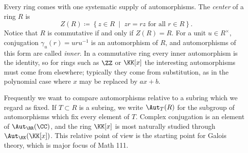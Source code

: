 \documentclass[12pt,reqno]{amsart}
\begin{document}
Every ring comes with one systematic supply of automorphisms. The \emph{center} of a ring $R$ is
\[
 Z(R)\coloneqq\left\{z\in R \;\; \big| \;\; zr=rz \text{ for all } r\in R\right\}.
\]
Notice that $R$ is commutative if and only if $Z(R)=R$. For a unit $u\in R^\times$, conjugation $\gamma_u(r)=uru^{-1}$ is an automorphism of $R$, and automorphisms of this form are called \emph{inner}. In a commutative ring every inner automorphism is the identity, so for rings such as $\ZZ$ or $\KK[x]$ the interesting automorphisms must come from elsewhere; typically they come from substitution, as in the polynomial case where $x$ may be replaced by $ax+b$.
 
Frequently we want to compare automorphisms relative to a subring which we regard as fixed. If $T\subset R$ is a subring, we write $\Aut_T(R)$ for the subgroup of automorphisms which fix every element of $T$. Complex conjugation is an element of $\Aut_\RR(\CC)$, and the ring $\KK[x]$ is most naturally studied through $\Aut_\KK(\KK[x])$. This relative point of view is the starting point for Galois theory, which is major focus of Math 111.  
 
\hrulefill
 
\end{document}

